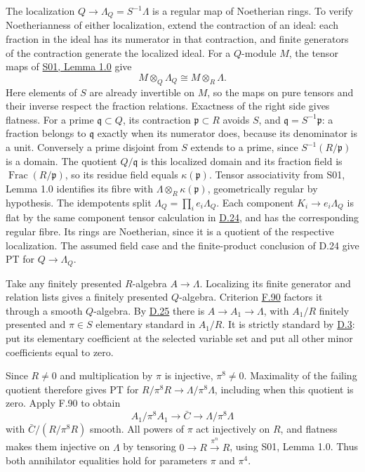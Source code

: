 \documentclass[11pt,a4paper,openany]{report}
\begin{document}
The localization \(Q\to\Lambda_Q=S^{-1}\Lambda\) is a regular map of Noetherian rings. To verify Noetherianness of either localization, extend the contraction of an ideal: each fraction in the ideal has its numerator in that contraction, and finite generators of the contraction generate the localized ideal. For a \(Q\)-module \(M\), the tensor maps of \href{https://github.com/KokunoYumeto/open-math-courses/blob/main/docs/courses/AG-RG/AG-RG-S01.md}{S01, Lemma 1.0} give \[
M\otimes_Q\Lambda_Q\cong M\otimes_R\Lambda.
\] Here elements of \(S\) are already invertible on \(M\), so the maps on pure tensors and their inverse respect the fraction relations. Exactness of the right side gives flatness. For a prime \(\mathfrak q\subset Q\), its contraction \(\mathfrak p\subset R\) avoids \(S\), and \(\mathfrak q=S^{-1}\mathfrak p\): a fraction belongs to \(\mathfrak q\) exactly when its numerator does, because its denominator is a unit. Conversely a prime disjoint from \(S\) extends to a prime, since \(S^{-1}(R/\mathfrak p)\) is a domain. The quotient \(Q/\mathfrak q\) is this localized domain and its fraction field is \(\operatorname{Frac}(R/\mathfrak p)\), so its residue field equals \(\kappa(\mathfrak p)\). Tensor associativity from S01, Lemma 1.0 identifies its fibre with \(\Lambda\otimes_R\kappa(\mathfrak p)\), geometrically regular by hypothesis. The idempotents split \(\Lambda_Q=\prod_i e_i\Lambda_Q\). Each component \(K_i\to e_i\Lambda_Q\) is flat by the same component tensor calculation in \hyperref[AG-RG-S05-smoothing-lemma-product]{D.24}, and has the corresponding regular fibre. Its rings are Noetherian, since it is a quotient of the respective localization. The assumed field case and the finite-product conclusion of D.24 give PT for \(Q\to\Lambda_Q\).

Take any finitely presented \(R\)-algebra \(A\to\Lambda\). Localizing its finite generator and relation lists gives a finitely presented \(Q\)-algebra. Criterion \hyperref[AG-RG-S05-algebra-lemma-when-colimit]{F.90} factors it through a smooth \(Q\)-algebra. By \hyperref[AG-RG-S05-smoothing-lemma-delocalize-base]{D.25} there is \(A\to A_1\to\Lambda\), with \(A_1/R\) finitely presented and \(\pi\in S\) elementary standard in \(A_1/R\). It is strictly standard by \hyperref[AG-RG-S05-smoothing-definition-strictly-standard]{D.3}: put its elementary coefficient at the selected variable set and put all other minor coefficients equal to zero.

Since \(R\ne0\) and multiplication by \(\pi\) is injective, \(\pi^8\ne0\). Maximality of the failing quotient therefore gives PT for \(R/\pi^8R\to\Lambda/\pi^8\Lambda\), including when this quotient is zero. Apply F.90 to obtain \[
A_1/\pi^8A_1\longrightarrow\bar C\longrightarrow\Lambda/\pi^8\Lambda
\] with \(\bar C/(R/\pi^8R)\) smooth. All powers of \(\pi\) act injectively on \(R\), and flatness makes them injective on \(\Lambda\) by tensoring \(0\to R\xrightarrow{\pi^n}R\), using S01, Lemma 1.0. Thus both annihilator equalities hold for parameters \(\pi\) and \(\pi^4\).
\end{document}
